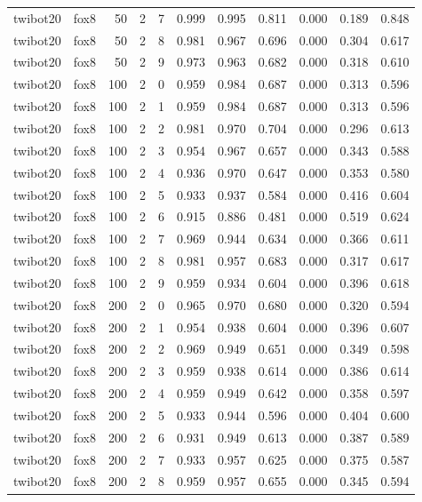 \begin{tabular}{llrrrrrrrrr}
twibot20 & fox8 & 50 & 2 & 7 & 0.999 & 0.995 & 0.811 & 0.000 & 0.189 & 0.848 \\
twibot20 & fox8 & 50 & 2 & 8 & 0.981 & 0.967 & 0.696 & 0.000 & 0.304 & 0.617 \\
twibot20 & fox8 & 50 & 2 & 9 & 0.973 & 0.963 & 0.682 & 0.000 & 0.318 & 0.610 \\
twibot20 & fox8 & 100 & 2 & 0 & 0.959 & 0.984 & 0.687 & 0.000 & 0.313 & 0.596 \\
twibot20 & fox8 & 100 & 2 & 1 & 0.959 & 0.984 & 0.687 & 0.000 & 0.313 & 0.596 \\
twibot20 & fox8 & 100 & 2 & 2 & 0.981 & 0.970 & 0.704 & 0.000 & 0.296 & 0.613 \\
twibot20 & fox8 & 100 & 2 & 3 & 0.954 & 0.967 & 0.657 & 0.000 & 0.343 & 0.588 \\
twibot20 & fox8 & 100 & 2 & 4 & 0.936 & 0.970 & 0.647 & 0.000 & 0.353 & 0.580 \\
twibot20 & fox8 & 100 & 2 & 5 & 0.933 & 0.937 & 0.584 & 0.000 & 0.416 & 0.604 \\
twibot20 & fox8 & 100 & 2 & 6 & 0.915 & 0.886 & 0.481 & 0.000 & 0.519 & 0.624 \\
twibot20 & fox8 & 100 & 2 & 7 & 0.969 & 0.944 & 0.634 & 0.000 & 0.366 & 0.611 \\
twibot20 & fox8 & 100 & 2 & 8 & 0.981 & 0.957 & 0.683 & 0.000 & 0.317 & 0.617 \\
twibot20 & fox8 & 100 & 2 & 9 & 0.959 & 0.934 & 0.604 & 0.000 & 0.396 & 0.618 \\
twibot20 & fox8 & 200 & 2 & 0 & 0.965 & 0.970 & 0.680 & 0.000 & 0.320 & 0.594 \\
twibot20 & fox8 & 200 & 2 & 1 & 0.954 & 0.938 & 0.604 & 0.000 & 0.396 & 0.607 \\
twibot20 & fox8 & 200 & 2 & 2 & 0.969 & 0.949 & 0.651 & 0.000 & 0.349 & 0.598 \\
twibot20 & fox8 & 200 & 2 & 3 & 0.959 & 0.938 & 0.614 & 0.000 & 0.386 & 0.614 \\
twibot20 & fox8 & 200 & 2 & 4 & 0.959 & 0.949 & 0.642 & 0.000 & 0.358 & 0.597 \\
twibot20 & fox8 & 200 & 2 & 5 & 0.933 & 0.944 & 0.596 & 0.000 & 0.404 & 0.600 \\
twibot20 & fox8 & 200 & 2 & 6 & 0.931 & 0.949 & 0.613 & 0.000 & 0.387 & 0.589 \\
twibot20 & fox8 & 200 & 2 & 7 & 0.933 & 0.957 & 0.625 & 0.000 & 0.375 & 0.587 \\
twibot20 & fox8 & 200 & 2 & 8 & 0.959 & 0.957 & 0.655 & 0.000 & 0.345 & 0.594 \\

\end{tabular}
